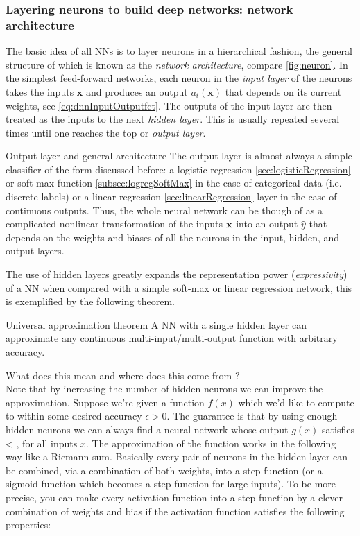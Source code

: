 \subsubsection{Layering neurons to build deep networks: network architecture}
\label{subsubsec:dnnNetworkArchitecture}
The basic idea of all NNs is to layer neurons in a hierarchical fashion, the general structure of which is known as the \emph{network architecture}, compare \ref{fig:neuron}. In the simplest feed-forward networks, each neuron in the \emph{input layer} of the neurons takes the inputs $\textbf{x}$ and produces an output $a_i(\textbf{x})$ that depends on its current weights, see \ref{eq:dnnInputOutputfct}. The outputs of the input layer are then treated as the inputs to the next \emph{hidden layer}. This is usually repeated several times until one reaches the top or \emph{output layer}.
\begin{mybox}{Output layer and general architecture}
	The output layer is almost always a simple classifier of the form discussed before: a logistic regression \ref{sec:logisticRegression} or soft-max function \ref{subsec:logregSoftMax} in the case of categorical data (i.e. discrete labels) or a linear regression \ref{sec:linearRegression} layer in the case of continuous outputs. Thus, the whole neural network can be though of as a complicated nonlinear transformation of the inputs $\textbf{x}$ into an output $\hat{y}$ that depends on the weights and biases of all the neurons in the input, hidden, and output layers.
\end{mybox}
The use of hidden layers greatly expands the representation power (\emph{expressivity}) of a NN when compared with a simple soft-max or linear regression network, this is exemplified by the following theorem.
\begin{mybox}{Universal approximation theorem}
	A NN with a single hidden layer can approximate any continuous multi-input/multi-output function with arbitrary accuracy.
\end{mybox}
What does this mean and where does this come from ?\\
Note that by increasing the number of hidden neurons we can improve the approximation. Suppose we're given a function $f(x)$ which we'd like to compute to within some desired accuracy $ϵ>0$. The guarantee is that by using enough hidden neurons we can always find a neural network whose output $g(x)$ satisfies 
 \bse 
  < \epsilon,
 \ese 
  for all inputs $x$.
The approximation of the function works in the following way like a Riemann sum. Basically every pair of neurons in the hidden layer can be combined, via a combination of both weights, into a step function (or a sigmoid function which becomes a step function for large inputs). To be more precise, you can make every activation function into a step function by a clever combination of weights and bias if the activation function satisfies the following properties:\\
